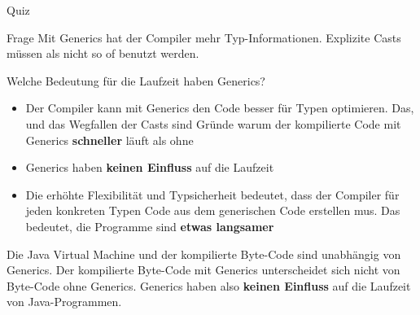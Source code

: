 \documentclass[usepdftitle=false,hyperref={pdfpagelabels=false}]{beamer}
\begin{document}
\begin{frame}{Quiz}
    \begin{block}{Frage}
        Mit Generics hat der Compiler mehr Typ-Informationen. Explizite
        Casts müssen als nicht so of benutzt werden.

        Welche Bedeutung für die Laufzeit haben Generics?
    \end{block}

    \begin{overprint}
    \begin{itemize}
        \item Der Compiler kann mit Generics den Code besser für
              Typen optimieren. Das, und das Wegfallen der Casts sind
              Gründe warum der kompilierte Code mit Generics
              \textbf{schneller} läuft als ohne
        \item Generics haben \textbf{keinen Einfluss} auf die Laufzeit
        \item Die erhöhte Flexibilität und Typsicherheit bedeutet,
              dass der Compiler für jeden konkreten Typen Code aus
              dem generischen Code erstellen mus. Das bedeutet,
              die Programme sind \textbf{etwas langsamer}
    \end{itemize}
        Die Java Virtual Machine und der kompilierte Byte-Code sind
        unabhängig von Generics. Der kompilierte Byte-Code mit Generics
        unterscheidet sich nicht von Byte-Code ohne Generics. Generics
        haben also \textbf{keinen Einfluss} auf die Laufzeit von Java-Programmen.
    \end{overprint}
\end{frame}
\end{document}
